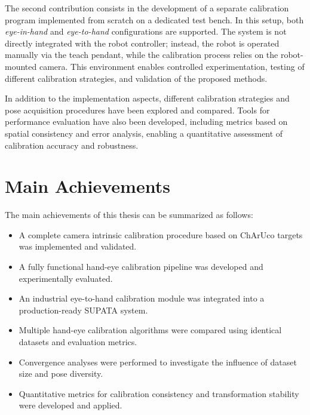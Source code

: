 The second contribution consists in the development of a separate
calibration program implemented from scratch on a dedicated test bench.
In this setup, both \textit{eye-in-hand} and \textit{eye-to-hand}
configurations are supported. The system is not directly integrated with
the robot controller; instead, the robot is operated manually via the
teach pendant, while the calibration process relies on the robot-mounted
camera. This environment enables controlled experimentation, testing of
different calibration strategies, and validation of the proposed methods.

In addition to the implementation aspects, different calibration strategies
and pose acquisition procedures have been explored and compared. Tools for
performance evaluation have also been developed, including metrics based on
spatial consistency and error analysis, enabling a quantitative assessment
of calibration accuracy and robustness.

\section{Main Achievements}
\label{sec:achievements}

The main achievements of this thesis can be summarized as follows:

\begin{itemize}
	
	\item A complete camera intrinsic calibration
	procedure based on ChArUco targets was
	implemented and validated.
	
	\item A fully functional hand-eye calibration
	pipeline was developed and experimentally
	evaluated.
	
	\item An industrial eye-to-hand calibration
	module was integrated into a production-ready
	SUPATA system.
	
	\item Multiple hand-eye calibration algorithms
	were compared using identical datasets and
	evaluation metrics.
	
	\item Convergence analyses were performed to
	investigate the influence of dataset size and
	pose diversity.
	
	\item Quantitative metrics for calibration
	consistency and transformation stability
	were developed and applied.
	
\end{itemize}

